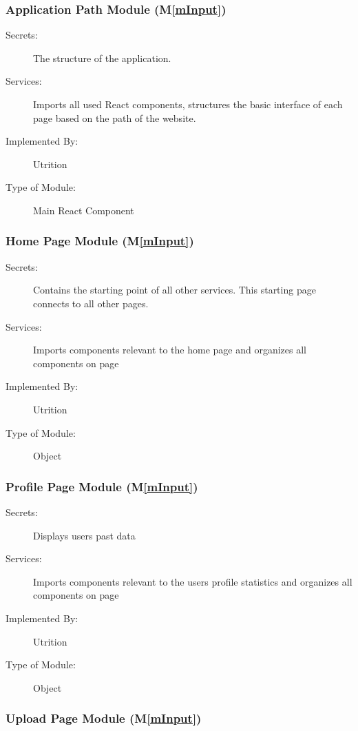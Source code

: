 \documentclass[12pt, titlepage]{article}
\newcommand{\mref}[1]{M\ref{#1}}
\begin{document}
\subsubsection{Application Path Module (\mref{mInput})}

\begin{description}
	\item[Secrets:] The structure of the application.
	\item[Services:] Imports all used React components, structures the basic 
	interface of each page based on the path of the website.
	\item[Implemented By:] Utrition
	\item[Type of Module:] Main React Component
\end{description}

\subsubsection{Home Page Module (\mref{mInput})}

\begin{description}
\item[Secrets:]Contains the starting point of all other services. This starting page connects to all other pages.
\item[Services:] Imports components relevant to the home page and organizes all components on page 
\item[Implemented By:] Utrition
\item[Type of Module:] Object 
\end{description}

\subsubsection{Profile Page Module (\mref{mInput})}

\begin{description}
\item[Secrets:]Displays users past data
\item[Services:] Imports components relevant to the users profile statistics and organizes all components on page 
\item[Implemented By:] Utrition
\item[Type of Module:] Object
\end{description}

\subsubsection{Upload Page Module (\mref{mInput})}
\end{document}
